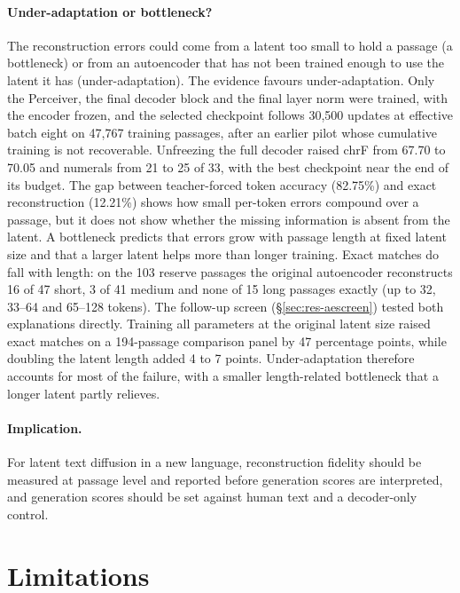 \documentclass[11pt,a4paper]{article}
\begin{document}
\paragraph{Under-adaptation or bottleneck?}
The reconstruction errors could come from a latent too small to hold a passage (a bottleneck) or from an autoencoder that has not been trained enough to use the latent it has (under-adaptation). The evidence favours under-adaptation. Only the Perceiver, the final decoder block and the final layer norm were trained, with the encoder frozen, and the selected checkpoint follows 30,500 updates at effective batch eight on 47,767 training passages, after an earlier pilot whose cumulative training is not recoverable. Unfreezing the full decoder raised chrF from 67.70 to 70.05 and numerals from 21 to 25 of 33, with the best checkpoint near the end of its budget. The gap between teacher-forced token accuracy (82.75\%) and exact reconstruction (12.21\%) shows how small per-token errors compound over a passage, but it does not show whether the missing information is absent from the latent. A bottleneck predicts that errors grow with passage length at fixed latent size and that a larger latent helps more than longer training. Exact matches do fall with length: on the 103 reserve passages the original autoencoder reconstructs 16 of 47 short, 3 of 41 medium and none of 15 long passages exactly (up to 32, 33--64 and 65--128 tokens). The follow-up screen (\S\ref{sec:res-aescreen}) tested both explanations directly. Training all parameters at the original latent size raised exact matches on a 194-passage comparison panel by 47 percentage points, while doubling the latent length added 4 to 7 points. Under-adaptation therefore accounts for most of the failure, with a smaller length-related bottleneck that a longer latent partly relieves.

\paragraph{Implication.}
For latent text diffusion in a new language, reconstruction fidelity should be measured at passage level and reported before generation scores are interpreted, and generation scores should be set against human text and a decoder-only control.

\section{Limitations}
\label{sec:limitations}
\end{document}
